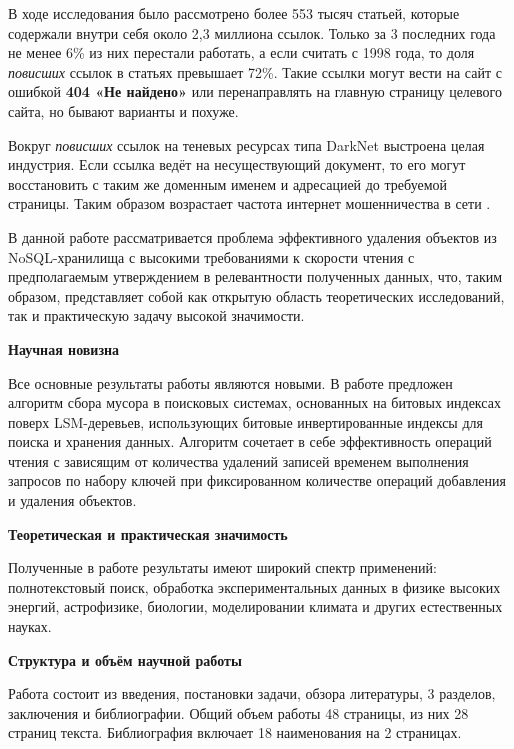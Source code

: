 В ходе исследования было рассмотрено более 553 тысяч статьей, которые содержали
внутри себя около 2,3 миллиона ссылок. Только за 3 последних года не менее 6\%
из них перестали работать, а если считать с 1998 года, то доля \textit{повисших}
ссылок в статьях превышает 72\%. Такие ссылки могут вести на сайт с
ошибкой \textbf{404 «Не найдено»} или перенаправлять на главную страницу целевого
сайта, но бывают варианты и похуже.

Вокруг \textit{повисших} ссылок на теневых ресурсах типа DarkNet выстроена целая
индустрия. Если ссылка ведёт на несуществующий документ, то его могут восстановить
с таким же доменным именем и адресацией до требуемой страницы. Таким образом
возрастает частота интернет мошенничества в сети \cite{Fraud}.

В данной работе рассматривается проблема эффективного удаления объектов из
NoSQL-хранилища с высокими требованиями к скорости чтения с предполагаемым
утверждением в релевантности полученных данных, что, таким образом, представляет
собой как открытую область теоретических исследований, так и практическую задачу
высокой значимости.

\textbf{Научная новизна}

Все основные результаты работы являются новыми. В работе предложен алгоритм
сбора мусора в поисковых системах, основанных на битовых индексах
поверх LSM-деревьев, использующих битовые инвертированные индексы для поиска и
хранения данных. Алгоритм сочетает в себе эффективность операций чтения с
зависящим от количества удалений записей временем выполнения запросов по
набору ключей при фиксированном количестве операций добавления и удаления
объектов.

\textbf{Теоретическая и практическая значимость}

Полученные в работе результаты имеют широкий спектр применений: полнотекстовый поиск,
обработка экспериментальных данных в физике высоких энергий, астрофизике, биологии,
моделировании климата и других естественных науках.

\textbf{Структура и объём научной работы}

Работа состоит из введения, постановки задачи, обзора литературы, 3
разделов, заключения и библиографии. Общий объем работы 48 страницы, из
них 28 страниц текста. Библиография включает 18 наименования на 2 страницах.
